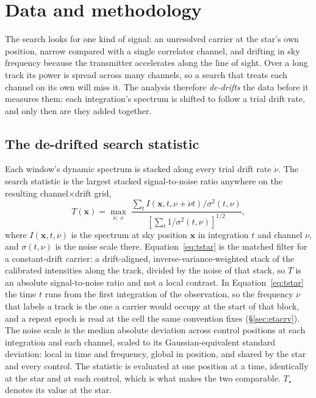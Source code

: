 \section{Data and methodology}
\label{sec:method}

The search looks for one kind of signal: an unresolved carrier at the
star's own position, narrow compared with a single correlator channel, and
drifting in sky frequency because the transmitter accelerates along the line
of sight. Over a long track its power is spread across many channels, so a
search that treats each channel on its own will miss it. The analysis therefore \emph{de-drifts} the data before it measures them:
each integration's spectrum is shifted to follow a trial drift rate, and only
then are they added together.

\subsection{The de-drifted search statistic}
\label{sec:statistic}

Each window's dynamic spectrum is stacked along every trial drift rate
$\dot\nu$. The search statistic is the largest stacked signal-to-noise
ratio anywhere on the resulting channel$\times$drift grid,
%
\begin{equation}
T(\mathbf{x})=\max_{\dot\nu,\;\nu}\;
\frac{\sum_{t} I\!\left(\mathbf{x},t,\nu+\dot\nu t\right)\big/\sigma^{2}(t,\nu)}
     {\left[\sum_{t}1\big/\sigma^{2}(t,\nu)\right]^{1/2}},
\label{eq:tstar}
\end{equation}
%
where $I(\mathbf{x},t,\nu)$ is the spectrum at sky position $\mathbf{x}$
in integration $t$ and channel $\nu$, and $\sigma(t,\nu)$ is the noise scale
there. Equation~\ref{eq:tstar} is the matched filter for a constant-drift
carrier: a drift-aligned, inverse-variance-weighted stack of the calibrated
intensities along the track, divided by the noise of that stack, so $T$ is an
absolute signal-to-noise ratio and not a local contrast. In Equation~\ref{eq:tstar} the time $t$ runs from the first integration of the
observation, so the frequency $\nu$ that labels a track is the one a carrier
would occupy at the start of that block, and a repeat epoch is read at the
cell the same convention fixes (\S\ref{sec:etacrv}).
The noise scale is the median absolute deviation
across \NCtrl{} control positions at each integration and each channel,
scaled to its Gaussian-equivalent standard deviation: local in time and
frequency, global in position, and shared by the star and every control.
The statistic is evaluated at one position at a time, identically at the
star and at each control, which is what makes the two comparable.
$T_\star$ denotes its value at the star.

